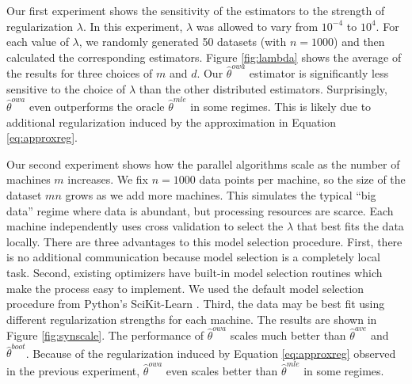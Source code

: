 \documentclass[twoside]{article}
\newcommand{\w}{\theta}
\newcommand{\wowa}{\hat\w^{owa}}
\newcommand{\wave}{\hat\w^{ave}}
\newcommand{\wboot}{\hat\w^{boot}}
\newcommand{\wmle}{\hat\w^{mle}}
\begin{document}
Our first experiment shows the sensitivity of the estimators to the strength of regularization $\lambda$.
In this experiment, $\lambda$ was allowed to vary from $10^{-4}$ to $10^4$.
For each value of $\lambda$, we randomly generated 50 datasets (with $n=1000$) and then calculated the corresponding estimators.
Figure \ref{fig:lambda} shows the average of the results for three choices of $m$ and $d$.
Our $\wowa$ estimator is significantly less sensitive to the choice of $\lambda$ than the other distributed estimators.
Surprisingly, $\wowa$ even outperforms the oracle $\wmle$ in some regimes.
This is likely due to additional regularization induced by the approximation in Equation \ref{eq:approxreg}.

Our second experiment shows how the parallel algorithms scale as the number of machines $m$ increases.
We fix $n=1000$ data points per machine,
so the size of the dataset $mn$ grows as we add more machines.
This simulates the typical ``big data'' regime where data is abundant,
but processing resources are scarce.
Each machine independently uses cross validation to select the $\lambda$ that best fits the data locally.
There are three advantages to this model selection procedure.
First, there is no additional communication because model selection is a completely local task.
Second, existing optimizers have built-in model selection routines which make the process easy to implement.
We used the default model selection procedure from Python's SciKit-Learn \citep{scikit-learn}.
Third, the data may be best fit using different regularization strengths for each machine.
The results are shown in Figure \ref{fig:synscale}.
The performance of $\wowa$ scales much better than $\wave$ and $\wboot$.
Because of the regularization induced by Equation \ref{eq:approxreg} observed in the previous experiment,
$\wowa$ even scales better than $\wmle$ in some regimes.
\end{document}
